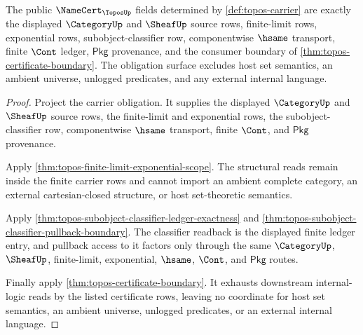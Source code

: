 \begin{theorem}
\label{thm:topos-namecert-obligation-surface}
The public $\NameCert_{\ToposUp}$ fields determined by \autoref{def:topos-carrier} are exactly the displayed $\CategoryUp$ and $\SheafUp$ source rows, finite-limit rows, exponential rows, subobject-classifier row, componentwise $\hsame$ transport, finite $\Cont$ ledger, $\mathsf{Pkg}$ provenance, and the consumer boundary of \autoref{thm:topos-certificate-boundary}. The obligation surface excludes host set semantics, an ambient universe, unlogged predicates, and any external internal language.
\end{theorem}
\begin{proof}
Project the carrier obligation. It supplies the displayed $\CategoryUp$ and $\SheafUp$ source rows, the finite-limit and exponential rows, the subobject-classifier row, componentwise $\hsame$ transport, finite $\Cont$, and $\mathsf{Pkg}$ provenance.

Apply \autoref{thm:topos-finite-limit-exponential-scope}. The structural reads remain inside the finite carrier rows and cannot import an ambient complete category, an external cartesian-closed structure, or host set-theoretic semantics.

Apply \autoref{thm:topos-subobject-classifier-ledger-exactness} and \autoref{thm:topos-subobject-classifier-pullback-boundary}. The classifier readback is the displayed finite ledger entry, and pullback access to it factors only through the same $\CategoryUp$, $\SheafUp$, finite-limit, exponential, $\hsame$, $\Cont$, and $\mathsf{Pkg}$ routes.

Finally apply \autoref{thm:topos-certificate-boundary}. It exhausts downstream internal-logic reads by the listed certificate rows, leaving no coordinate for host set semantics, an ambient universe, unlogged predicates, or an external internal language.
\end{proof}

